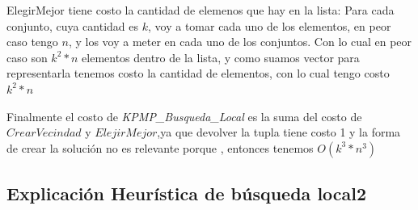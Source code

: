 \documentclass[a4paper]{article}
\begin{document}
ElegirMejor tiene costo la cantidad de elemenos que hay en la lista:
Para cada conjunto, cuya cantidad es $k$, voy a tomar cada uno de los elementos, en peor caso tengo $n$, y los voy a meter en cada uno de los conjuntos.
Con lo cual en peor caso son $k^{2}*n$ elementos dentro de la lista, y como suamos vector para representarla tenemos costo la cantidad de elementos, con lo cual tengo costo $k^{2}*n$

Finalmente el costo de \textit{K\-PMP\_Busqueda\_Local} es la suma del costo de $CrearVecindad$ y $ElejirMejor$,ya que devolver la tupla tiene costo 1 y la forma de crear la solución no es relevante porque , entonces tenemos $O(k^{3}*n^{3})$

\subsection{Explicación Heurística de búsqueda local2}
\end{document}
